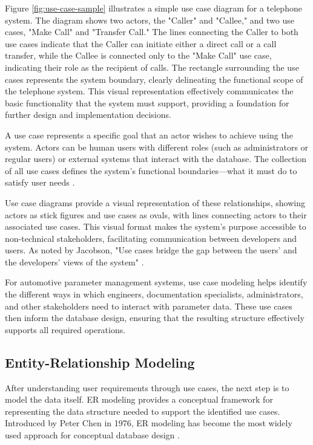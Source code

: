 Figure \ref{fig:use-case-sample} illustrates a simple use case diagram for a telephone system. The diagram shows two actors, the "Caller" and "Callee," and two use cases, "Make Call" and "Transfer Call." The lines connecting the Caller to both use cases indicate that the Caller can initiate either a direct call or a call transfer, while the Callee is connected only to the "Make Call" use case, indicating their role as the recipient of calls. The rectangle surrounding the use cases represents the system boundary, clearly delineating the functional scope of the telephone system. This visual representation effectively communicates the basic functionality that the system must support, providing a foundation for further design and implementation decisions.

A use case represents a specific goal that an actor wishes to achieve using the system. Actors can be human users with different roles (such as administrators or regular users) or external systems that interact with the database. The collection of all use cases defines the system's functional boundaries—what it must do to satisfy user needs \cite{jacobson2004use}.

Use case diagrams provide a visual representation of these relationships, showing actors as stick figures and use cases as ovals, with lines connecting actors to their associated use cases. This visual format makes the system's purpose accessible to non-technical stakeholders, facilitating communication between developers and users. As noted by Jacobson, "Use cases bridge the gap between the users' and the developers' views of the system" \cite{jacobson2004use}.

For automotive parameter management systems, use case modeling helps identify the different ways in which engineers, documentation specialists, administrators, and other stakeholders need to interact with parameter data. These use cases then inform the database design, ensuring that the resulting structure effectively supports all required operations.


\subsection{Entity-Relationship Modeling}
\label{subsec:entity-relationship-modeling}

After understanding user requirements through use cases, the next step is to model the data itself. \ac{ER} modeling provides a conceptual framework for representing the data structure needed to support the identified use cases. Introduced by Peter Chen in 1976, \ac{ER} modeling has become the most widely used approach for conceptual database design \cite{chen1976entity}.

